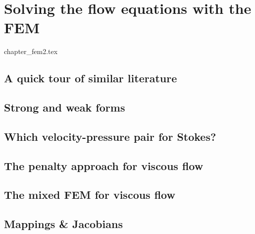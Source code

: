 \chapter{Solving the flow equations with the FEM} \label{solvingFEM} %
\begin{flushright} {\tiny {\color{gray} chapter\_fem2.tex}} \end{flushright}

\section{A quick tour of similar literature} 
 

\newpage %
\section{Strong and weak forms}  %

\newpage %
\section{Which velocity-pressure pair for Stokes?}\label{ss:pair} %

\newpage %
\section{The penalty approach for viscous flow}\label{sec:penalty} %

\newpage %
\section{The mixed FEM for viscous flow} \label{sec:mixed}  %

\newpage %
\section{Mappings \& Jacobians \label{ss:mappings}}  %


